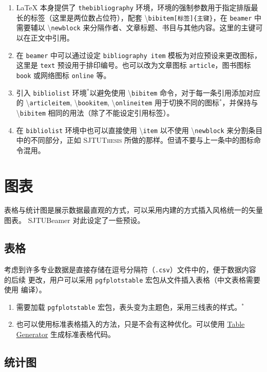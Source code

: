 \documentclass[
    UTF8,
    heading=true,
    12pt,
    a4paper
]{ctexrep}
\newenvironment{commentlist}
{\begin{enumerate}\small}
{\end{enumerate}}
\newcommand{\cmd}[1]{\textbackslash{}\texttt{#1}}
\newcommand{\cls}[1]{\texttt{#1}}
\newcommand{\env}[1]{\texttt{#1}}
\newcommand{\pkg}[1]{\texttt{#1}}
\newcommand{\opt}[1]{\texttt{#1}}
\def\themename{\textsf{SJTUBeamer}}
\begin{document}
\begin{commentlist}
  \item \LaTeX{} 本身提供了 \env{thebibliography}
  环境，环境的强制参数用于指定排版最长的标签（这里是两位数占位符），配套
  \cmd{bibitem[标签]\{主键\}}，在 \cls{beamer} 中需要辅以
  \cmd{newblock}
  来分隔作者、文章标题、书目与其他内容。这里的主键可以在正文中引用。
  \item 在 \cls{beamer} 中可以通过设定 \opt{bibliography
    item}
  模板为对应预设来更改图标，这里是 \opt{text}
  预设用于排印编号。也可以改为文章图标 \opt{article}，图书图标
  \opt{book}
  或网络图标 \opt{online} 等。
  \item 引入 \env{bibliolist} 环境$^*$以避免使用
  \cmd{bibitem} 命令，对于每一条引用添加对应的
  \cmd{articleitem},
  \cmd{bookitem}, \cmd{onlineitem}
  用于切换不同的图标$^*$，并保持与 \cmd{bibitem}
  相同的用法（除了不能设定引用标签）。
  \item 在 \env{bibliolist} 环境中也可以直接使用 \cmd{item}
  以不使用 \cmd{newblock} 来分割条目中的不同部分，正如
  \textsc{SJTUThesis} 所做的那样。但请不要与上一条中的图标命令混用。
\end{commentlist}

\chapter{图表}

表格与统计图是展示数据最直观的方式，可以采用内建的方式插入风格统一的矢量图表。
\themename{} 对此设定了一些预设。

\section{表格}

考虑到许多专业数据是直接存储在逗号分隔符（\texttt{.csv}）文件中的，便于数据内容的后续
更改，用户可以采用 \pkg{pgfplotstable} 宏包从文件插入表格（中文表格需要使用
 编译）。


\begin{commentlist}
  \item 需要加载 \pkg{pgfplotstable}
  宏包，表头变为主题色，采用三线表的样式。$^*$
  \item 也可以使用标准表格插入的方法，只是不会有这种优化。可以使用
  \href{https://www.tablesgenerator.com/latex_tables}
  {Table Generator} 生成标准表格代码。
\end{commentlist}

\section{统计图}
\end{document}
